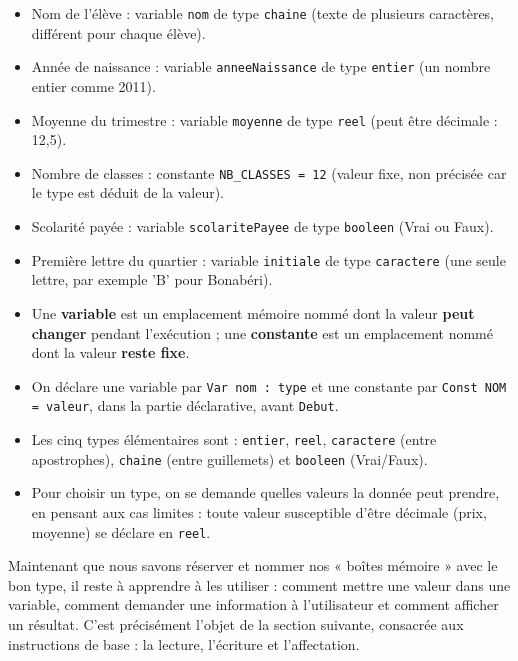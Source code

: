 \documentclass[11pt]{article}
\begin{document}
\begin{corrige}[Exercice 1]
\begin{itemize}
\item Nom de l'élève : variable \texttt{nom} de type \texttt{chaine} (texte de plusieurs caractères, différent pour chaque élève).
\item Année de naissance : variable \texttt{anneeNaissance} de type \texttt{entier} (un nombre entier comme 2011).
\item Moyenne du trimestre : variable \texttt{moyenne} de type \texttt{reel} (peut être décimale : 12,5).
\item Nombre de classes : constante \texttt{NB\_CLASSES = 12} (valeur fixe, non précisée car le type est déduit de la valeur).
\item Scolarité payée : variable \texttt{scolaritePayee} de type \texttt{booleen} (Vrai ou Faux).
\item Première lettre du quartier : variable \texttt{initiale} de type \texttt{caractere} (une seule lettre, par exemple 'B' pour Bonabéri).
\end{itemize}
\end{corrige}

\begin{aretenir}
\begin{itemize}
\item Une \textbf{variable} est un emplacement mémoire nommé dont la valeur \textbf{peut changer} pendant l'exécution ; une \textbf{constante} est un emplacement nommé dont la valeur \textbf{reste fixe}.
\item On déclare une variable par \texttt{Var nom : type} et une constante par \texttt{Const NOM = valeur}, dans la partie déclarative, avant \texttt{Debut}.
\item Les cinq types élémentaires sont : \texttt{entier}, \texttt{reel}, \texttt{caractere} (entre apostrophes), \texttt{chaine} (entre guillemets) et \texttt{booleen} (Vrai/Faux).
\item Pour choisir un type, on se demande quelles valeurs la donnée peut prendre, en pensant aux cas limites : toute valeur susceptible d'être décimale (prix, moyenne) se déclare en \texttt{reel}.
\end{itemize}
\end{aretenir}

Maintenant que nous savons réserver et nommer nos « boîtes mémoire » avec le bon type, il reste à apprendre à les utiliser : comment mettre une valeur dans une variable, comment demander une information à l'utilisateur et comment afficher un résultat. C'est précisément l'objet de la section suivante, consacrée aux instructions de base : la lecture, l'écriture et l'affectation.
\end{document}
